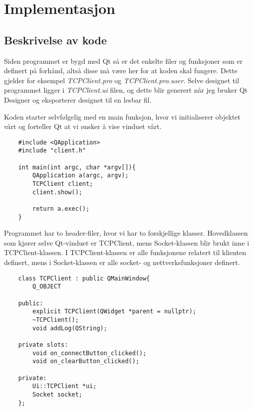 \section{Implementasjon}
\subsection{Beskrivelse av kode}
Siden programmet er bygd med Qt så er det enkelte filer og funksjoner som er definert på forhånd, altså disse må være her for at koden skal fungere. Dette gjelder for eksempel \textit{TCPClient.pro} og \textit{TCPClient.pro.user}. Selve designet til programmet ligger i \textit{TCPClient.ui} filen, og dette blir generert når jeg bruker Qt Designer og eksporterer designet til en lesbar fil.

Koden starter selvfølgelig med en main funksjon, hvor vi initialiserer objektet vårt og forteller Qt at vi ønsker å vise vinduet vårt.
\begin{lstlisting}
	#include <QApplication>
	#include "client.h"

	int main(int argc, char *argv[]){
		QApplication a(argc, argv);
		TCPClient client;
		client.show();

		return a.exec();
	}
\end{lstlisting}

Programmet har to header-filer, hvor vi har to forskjellige klasser. Hovedklassen som kjører selve Qt-vinduet er TCPClient, mens Socket-klassen blir brukt inne i TCPClient-klassen. I TCPClient-klassen er alle funksjonene relatert til klienten definert, mens i Socket-klassen er alle socket- og nettverksfunksjoner definert.
\begin{lstlisting}
	class TCPClient : public QMainWindow{
		Q_OBJECT

	public:
		explicit TCPClient(QWidget *parent = nullptr);
		~TCPClient();
		void addLog(QString);

	private slots:
		void on_connectButton_clicked();
		void on_clearButton_clicked();

	private:
		Ui::TCPClient *ui;
		Socket socket;
	};
\end{lstlisting}

